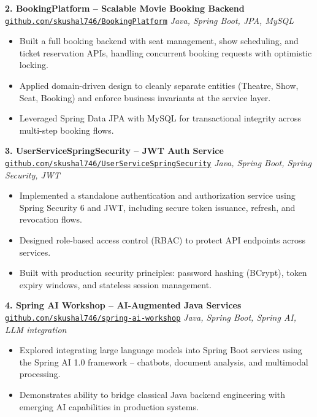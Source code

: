 \documentclass[11pt,letterpaper]{article}
\begin{document}
\vspace{6pt}

\textbf{2. BookingPlatform -- Scalable Movie Booking Backend}\\
\href{https://github.com/skushal746/BookingPlatform}{\texttt{github.com/skushal746/BookingPlatform}} \hfill \textit{Java, Spring Boot, JPA, MySQL}
\begin{itemize}[leftmargin=0.3in, noitemsep, topsep=2pt, partopsep=0pt, parsep=0pt]
    \item Built a full booking backend with seat management, show scheduling, and ticket reservation APIs, handling concurrent booking requests with optimistic locking.
    \item Applied domain-driven design to cleanly separate entities (Theatre, Show, Seat, Booking) and enforce business invariants at the service layer.
    \item Leveraged Spring Data JPA with MySQL for transactional integrity across multi-step booking flows.
\end{itemize}

\vspace{6pt}

\textbf{3. UserServiceSpringSecurity -- JWT Auth Service}\\
\href{https://github.com/skushal746/UserServiceSpringSecurity}{\texttt{github.com/skushal746/UserServiceSpringSecurity}} \hfill \textit{Java, Spring Boot, Spring Security, JWT}
\begin{itemize}[leftmargin=0.3in, noitemsep, topsep=2pt, partopsep=0pt, parsep=0pt]
    \item Implemented a standalone authentication and authorization service using Spring Security 6 and JWT, including secure token issuance, refresh, and revocation flows.
    \item Designed role-based access control (RBAC) to protect API endpoints across services.
    \item Built with production security principles: password hashing (BCrypt), token expiry windows, and stateless session management.
\end{itemize}

\vspace{6pt}

\textbf{4. Spring AI Workshop -- AI-Augmented Java Services}\\
\href{https://github.com/skushal746/spring-ai-workshop}{\texttt{github.com/skushal746/spring-ai-workshop}} \hfill \textit{Java, Spring Boot, Spring AI, LLM integration}
\begin{itemize}[leftmargin=0.3in, noitemsep, topsep=2pt, partopsep=0pt, parsep=0pt]
    \item Explored integrating large language models into Spring Boot services using the Spring AI 1.0 framework -- chatbots, document analysis, and multimodal processing.
    \item Demonstrates ability to bridge classical Java backend engineering with emerging AI capabilities in production systems.
\end{itemize}
\end{document}
